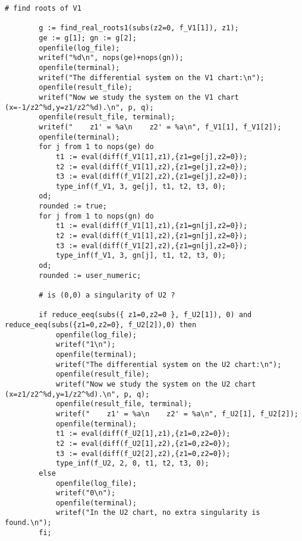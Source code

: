 \documentclass[a4paper,10pt]{article}
\begin{document}
\begin{lstlisting}[name=infinity]
        # find roots of V1

        g := find_real_roots1(subs(z2=0, f_V1[1]), z1);
        ge := g[1]; gn := g[2];
        openfile(log_file);
        writef("%d\n", nops(ge)+nops(gn));
        openfile(terminal);
        writef("The differential system on the V1 chart:\n");
        openfile(result_file);
        writef("Now we study the system on the V1 chart (x=-1/z2^%d,y=z1/z2^%d).\n", p, q);
        openfile(result_file, terminal);
        writef("    z1' = %a\n    z2' = %a\n", f_V1[1], f_V1[2]);
        openfile(terminal);
        for j from 1 to nops(ge) do
            t1 := eval(diff(f_V1[1],z1),{z1=ge[j],z2=0});
            t2 := eval(diff(f_V1[1],z2),{z1=ge[j],z2=0});
            t3 := eval(diff(f_V1[2],z2),{z1=ge[j],z2=0});
            type_inf(f_V1, 3, ge[j], t1, t2, t3, 0);
        od;
        rounded := true;
        for j from 1 to nops(gn) do
            t1 := eval(diff(f_V1[1],z1),{z1=gn[j],z2=0});
            t2 := eval(diff(f_V1[1],z2),{z1=gn[j],z2=0});
            t3 := eval(diff(f_V1[2],z2),{z1=gn[j],z2=0});
            type_inf(f_V1, 3, gn[j], t1, t2, t3, 0);
        od;
        rounded := user_numeric;

        # is (0,0) a singularity of U2 ?

        if reduce_eeq(subs({ z1=0,z2=0 }, f_U2[1]), 0) and reduce_eeq(subs({z1=0,z2=0}, f_U2[2]),0) then
            openfile(log_file);
            writef("1\n");
            openfile(terminal);
            writef("The differential system on the U2 chart:\n");
            openfile(result_file);
            writef("Now we study the system on the U2 chart (x=z1/z2^%d,y=1/z2^%d).\n", p, q);
            openfile(result_file, terminal);
            writef("    z1' = %a\n    z2' = %a\n", f_U2[1], f_U2[2]);
            openfile(terminal);
            t1 := eval(diff(f_U2[1],z1),{z1=0,z2=0});
            t2 := eval(diff(f_U2[1],z2),{z1=0,z2=0});
            t3 := eval(diff(f_U2[2],z2),{z1=0,z2=0});
            type_inf(f_U2, 2, 0, t1, t2, t3, 0);
        else
            openfile(log_file);
            writef("0\n");
            openfile(terminal);
            writef("In the U2 chart, no extra singularity is found.\n");
        fi;


\end{lstlisting}
\end{document}
